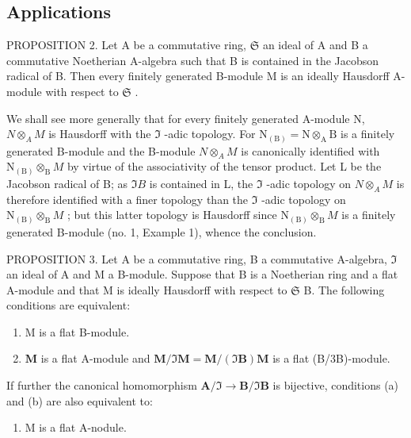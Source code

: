 \subsection{Applications}

PROPOSITION 2. Let A be a commutative ring, \(\mathfrak{S}\) an ideal of A and B a commutative Noetherian A-algebra such that B is contained in the Jacobson radical of B. Then every finitely generated B-module M is an ideally Hausdorff A-module with respect to \(\mathfrak{S}\) .

We shall see more generally that for every finitely generated A-module N, \(N \otimes_{A} M\) is Hausdorff with the \(\Im\) -adic topology. For \(\mathrm{N}_{(\mathrm{B})} = \mathrm{N} \otimes_{\mathrm{A}} \mathrm{B}\) is a finitely generated B-module and the B-module \(N \otimes_{A} M\) is canonically identified with \(\mathrm{N}_{(\mathrm{B})} \otimes_{\mathrm{B}} M\) by virtue of the associativity of the tensor product. Let L be the Jacobson radical of B; as \(\Im B\) is contained in L, the \(\Im\) -adic topology on \(N \otimes_{A} M\) is therefore identified with a finer topology than the \(\Im\) -adic topology on \(\mathrm{N}_{(\mathrm{B})} \otimes_{\mathrm{B}} M\) ; but this latter topology is Hausdorff since \(\mathrm{N}_{(\mathrm{B})} \otimes_{\mathrm{B}} M\) is a finitely generated B-module (no. 1, Example 1), whence the conclusion.

PROPOSITION 3. Let A be a commutative ring, B a commutative A-algebra, \(\mathfrak{I}\) an ideal of A and M a B-module. Suppose that B is a Noetherian ring and a flat A-module and that M is ideally Hausdorff with respect to \(\mathfrak{S}\) B. The following conditions are equivalent:

\begin{enumerate}
\def\labelenumi{(\alph{enumi})}
\item
  M is a flat B-module.
\item
  \(\mathbf{M}\) is a flat A-module and \(\mathbf{M} / \Im \mathbf{M} = \mathbf{M} / (\Im \mathbf{B})\mathbf{M}\) is a flat (B/3B)-module.
\end{enumerate}

If further the canonical homomorphism \(\mathbf{A} / \Im \to \mathbf{B} / \Im \mathbf{B}\) is bijective, conditions (a) and (b) are also equivalent to:

\begin{enumerate}
\def\labelenumi{(\alph{enumi})}
\setcounter{enumi}{2}
\tightlist
\item
  M is a flat A-nodule.
\end{enumerate}

